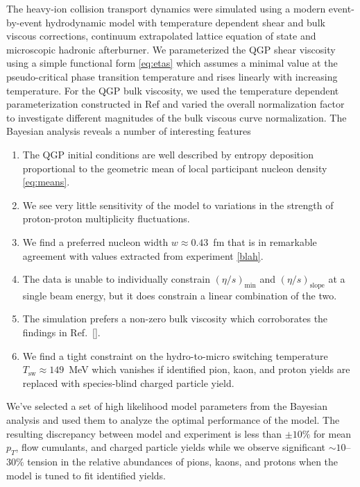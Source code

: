 \documentclass[aps,prc,reprint,amsmath,nofootinbib,superscriptaddress]{revtex4-1}
\begin{document}
The heavy-ion collision transport dynamics were simulated using a modern event-by-event hydrodynamic model with temperature dependent shear and bulk viscous corrections, continuum extrapolated lattice equation of state and microscopic hadronic afterburner. We parameterized the QGP shear viscosity using a simple functional form \eqref{eq:etas} which assumes a minimal value at the pseudo-critical phase transition temperature and rises linearly with increasing temperature. For the QGP bulk viscosity, we used the temperature dependent parameterization constructed in Ref and varied the overall normalization factor to investigate different magnitudes of the bulk viscous curve normalization.
The Bayesian analysis reveals a number of interesting features
\begin{enumerate}
    \item The QGP initial conditions are well described by entropy deposition proportional to the geometric mean of local participant nucleon density \eqref{eq:means}.

    \item We see very little sensitivity of the model to variations in the strength of proton-proton multiplicity fluctuations.

    \item We find a preferred nucleon width $w\approx0.43$~fm that is in remarkable agreement with values extracted from experiment \ref{blah}.

    \item The data is unable to individually constrain $(\eta/s)_\text{min}$ and $(\eta/s)_\text{slope}$ at a single beam energy, but it does constrain a linear combination of the two.

    \item The simulation prefers a non-zero bulk viscosity which corroborates the findings in Ref.~\ref{}.

    \item We find a tight constraint on the hydro-to-micro switching temperature ${T_\text{sw} \approx 149}$~MeV which vanishes if identified pion, kaon, and proton yields are replaced with species-blind charged particle yield.
\end{enumerate}

We've selected a set of high likelihood model parameters from the Bayesian analysis and used them to analyze the optimal performance of the model. The resulting discrepancy between model and experiment is less than $\pm10\%$ for mean $p_T$, flow cumulants, and charged particle yields while we observe significant $\sim\!10$--$30\%$ tension in the relative abundances of pions, kaons, and protons when the model is tuned to fit identified yields.
\end{document}
